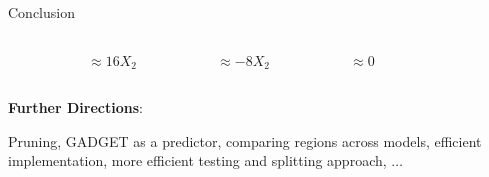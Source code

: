 \documentclass[10pt,compress,t,notes=noshow, xcolor=table]{beamer}
\begin{document}
\begin{frame}{Conclusion}
\begin{columns}[T, totalwidth = \textwidth]
\begin{column}{0.45\textwidth}
\begin{columns}[T, totalwidth = \linewidth]
\begin{column}{0.175\linewidth}
         \end{column}
        \begin{column}{0.225\linewidth}
\centering
            $\approx 16X_2$ %
         \end{column}
        \begin{column}{0.225\linewidth}
        \centering
            $ \approx -8X_2$ %
         \end{column}        
         \begin{column}{0.225\linewidth}
         \centering
             $\approx 0$%
         \end{column}
        \begin{column}{0.025\linewidth}

         \end{column}
     \end{columns}
    \end{column}

\end{columns}

\medskip
\textbf{Further Directions}: 

Pruning, GADGET as a predictor, comparing regions across models, efficient implementation, more efficient testing and splitting approach, $\dots$
\bigskip
\end{frame}




\endlecture
\end{document}
